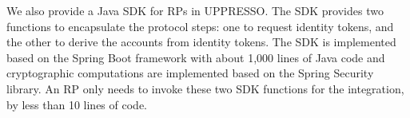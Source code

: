 


We also provide a Java SDK for RPs in UPPRESSO.
The SDK provides two functions to encapsulate the protocol steps:
 one to request identity tokens,
    and the other to derive the accounts from identity tokens.
The SDK is implemented based on the Spring Boot framework  with about 1,000 lines of Java code
 and cryptographic computations are implemented based on the Spring Security library.
An RP only needs to invoke these two SDK functions for the integration,
    by less than 10 lines of code.


